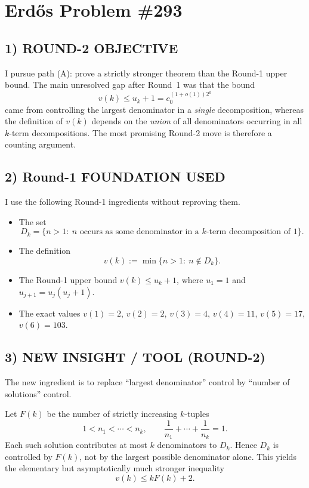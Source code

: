 \section{Erd\H{o}s Problem \#293}

\subsection*{1) ROUND-2 OBJECTIVE}

I pursue path (A): prove a strictly stronger theorem than the Round-1 upper bound. The main unresolved gap after Round~1 was that the bound
\[
v(k)\le u_k+1=c_0^{(1+o(1))2^k}
\]
came from controlling the largest denominator in a \emph{single} decomposition, whereas the definition of $v(k)$ depends on the \emph{union} of all denominators occurring in all $k$-term decompositions. The most promising Round-2 move is therefore a counting argument.

\subsection*{2) Round-1 FOUNDATION USED}

I use the following Round-1 ingredients without reproving them.

\begin{itemize}
\item The set
\[
D_k=\{n>1:\ \mbox{$n$ occurs as some denominator in a $k$-term decomposition of $1$}\}.
\]
\item The definition
\[
v(k):=\min\{n>1:\ n\notin D_k\}.
\]
\item The Round-1 upper bound $v(k)\le u_k+1$, where $u_1=1$ and $u_{j+1}=u_j(u_j+1)$.
\item The exact values $v(1)=2$, $v(2)=2$, $v(3)=4$, $v(4)=11$, $v(5)=17$, $v(6)=103$.
\end{itemize}

\subsection*{3) NEW INSIGHT / TOOL (ROUND-2)}

The new ingredient is to replace ``largest denominator'' control by ``number of solutions'' control.

Let $F(k)$ be the number of strictly increasing $k$-tuples
\[
1<n_1<\cdots<n_k,\qquad \frac1{n_1}+\cdots+\frac1{n_k}=1.
\]
Each such solution contributes at most $k$ denominators to $D_k$. Hence $D_k$ is controlled by $F(k)$, not by the largest possible denominator alone. This yields the elementary but asymptotically much stronger inequality
\[
v(k)\le kF(k)+2.
\]

